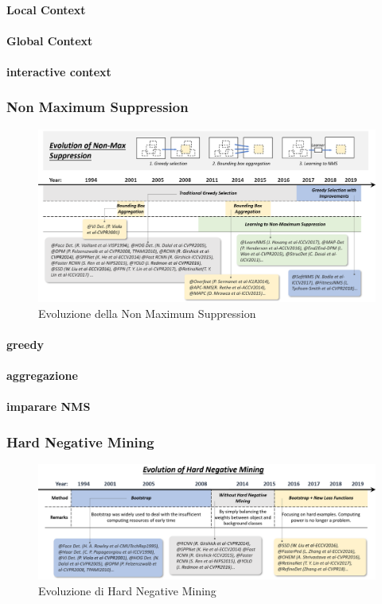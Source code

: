 \paragraph{Local Context}
\paragraph{Global Context}
\paragraph{interactive context}
\subsubsection{Non Maximum Suppression}
\begin{figure}
    \centering
    \includegraphics[width=\textwidth]{images/evol-nms.png}
    \caption{Evoluzione della Non Maximum Suppression \cite{DBLP:journals/corr/abs-1905-05055}}
    \label{fig:NMS_history}
\end{figure}
\paragraph{greedy}
\paragraph{aggregazione}
\paragraph{imparare NMS}
\subsubsection{Hard Negative Mining}
\begin{figure}
    \centering
    \includegraphics[width=\textwidth]{images/evol-hardnegmining.png}
    \caption{Evoluzione di Hard Negative Mining \cite{DBLP:journals/corr/abs-1905-05055}}
    \label{fig:HNM_history}
\end{figure}
